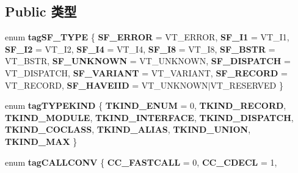 \subsection*{Public 类型}
\begin{DoxyCompactItemize}
\item 
\mbox{\label{interface_i_ole_automation_types_ac219642ecf9a3645b44bb0dc08455c3a}} 
enum {\bfseries tag\+S\+F\+\_\+\+T\+Y\+PE} \{ \newline
{\bfseries S\+F\+\_\+\+E\+R\+R\+OR} = V\+T\+\_\+\+E\+R\+R\+OR, 
{\bfseries S\+F\+\_\+\+I1} = V\+T\+\_\+\+I1, 
{\bfseries S\+F\+\_\+\+I2} = V\+T\+\_\+\+I2, 
{\bfseries S\+F\+\_\+\+I4} = V\+T\+\_\+\+I4, 
\newline
{\bfseries S\+F\+\_\+\+I8} = V\+T\+\_\+\+I8, 
{\bfseries S\+F\+\_\+\+B\+S\+TR} = V\+T\+\_\+\+B\+S\+TR, 
{\bfseries S\+F\+\_\+\+U\+N\+K\+N\+O\+WN} = V\+T\+\_\+\+U\+N\+K\+N\+O\+WN, 
{\bfseries S\+F\+\_\+\+D\+I\+S\+P\+A\+T\+CH} = V\+T\+\_\+\+D\+I\+S\+P\+A\+T\+CH, 
\newline
{\bfseries S\+F\+\_\+\+V\+A\+R\+I\+A\+NT} = V\+T\+\_\+\+V\+A\+R\+I\+A\+NT, 
{\bfseries S\+F\+\_\+\+R\+E\+C\+O\+RD} = V\+T\+\_\+\+R\+E\+C\+O\+RD, 
{\bfseries S\+F\+\_\+\+H\+A\+V\+E\+I\+ID} = V\+T\+\_\+\+U\+N\+K\+N\+O\+W\+N$\vert$\+V\+T\+\_\+\+R\+E\+S\+E\+R\+V\+ED
 \}
\item 
\mbox{\label{interface_i_ole_automation_types_a1590269629d404bdb45ff5b5219e706a}} 
enum {\bfseries tag\+T\+Y\+P\+E\+K\+I\+ND} \{ \newline
{\bfseries T\+K\+I\+N\+D\+\_\+\+E\+N\+UM} = 0, 
{\bfseries T\+K\+I\+N\+D\+\_\+\+R\+E\+C\+O\+RD}, 
{\bfseries T\+K\+I\+N\+D\+\_\+\+M\+O\+D\+U\+LE}, 
{\bfseries T\+K\+I\+N\+D\+\_\+\+I\+N\+T\+E\+R\+F\+A\+CE}, 
\newline
{\bfseries T\+K\+I\+N\+D\+\_\+\+D\+I\+S\+P\+A\+T\+CH}, 
{\bfseries T\+K\+I\+N\+D\+\_\+\+C\+O\+C\+L\+A\+SS}, 
{\bfseries T\+K\+I\+N\+D\+\_\+\+A\+L\+I\+AS}, 
{\bfseries T\+K\+I\+N\+D\+\_\+\+U\+N\+I\+ON}, 
\newline
{\bfseries T\+K\+I\+N\+D\+\_\+\+M\+AX}
 \}
\item 
\mbox{\label{interface_i_ole_automation_types_aabebe1d8e19457dcc3f63425f90e83dc}} 
enum {\bfseries tag\+C\+A\+L\+L\+C\+O\+NV} \{ \newline
{\bfseries C\+C\+\_\+\+F\+A\+S\+T\+C\+A\+LL} = 0, 
{\bfseries C\+C\+\_\+\+C\+D\+E\+CL} = 1, 

\end{DoxyCompactItemize}
